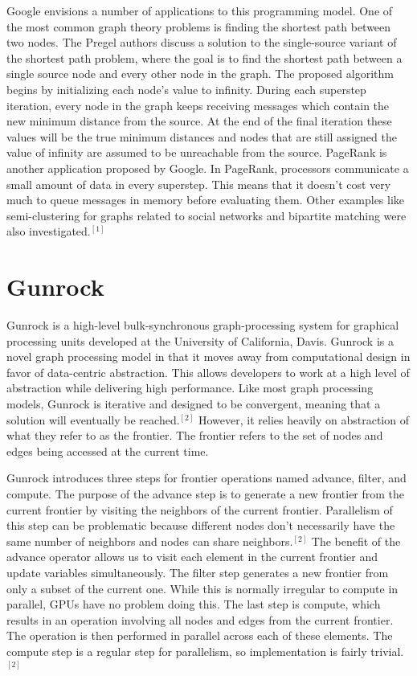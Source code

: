 \documentclass[conference]{IEEEtran}
\begin{document}
Google envisions a number of applications to this programming model.  One of the most common graph theory problems is finding the shortest path between two nodes.  The Pregel authors discuss a solution to the single-source variant of the shortest path problem, where the goal is to find the shortest path between a single source node and every other node in the graph.  The proposed algorithm begins by initializing each node's value to infinity.  During each superstep iteration, every node in the graph keeps receiving messages which contain the new minimum distance from the source.  At the end of the final iteration these values will be the true minimum distances and nodes that are still assigned the value of infinity are assumed to be unreachable from the source.  PageRank is another application proposed by Google.  In PageRank, processors communicate a small amount of data in every superstep.  This means that it doesn't cost very much to queue messages in memory before evaluating them.  Other examples like semi-clustering for graphs related to social networks and bipartite matching were also investigated.$^{[1]}$  

\section{Gunrock}

Gunrock is a high-level bulk-synchronous graph-processing system for graphical processing units developed at the University of California, Davis.  Gunrock is a novel graph processing model in that it moves away from computational design in favor of data-centric abstraction.  This allows developers to work at a high level of abstraction while delivering high performance.  Like most graph processing models, Gunrock is iterative and designed to be convergent, meaning that a solution will eventually be reached.$^{[2]}$  However, it relies heavily on abstraction of what they refer to as the frontier.  The frontier refers to the set of nodes and edges being accessed at the current time.  

Gunrock introduces three steps for frontier operations named advance, filter, and compute.  The purpose of the advance step is to generate a new frontier from the current frontier by visiting the neighbors of the current frontier.  Parallelism of this step can be problematic because different nodes don't necessarily have the same number of neighbors and nodes can share neighbors.$^{[2]}$  The benefit of the advance operator allows us to visit each element in the current frontier and update variables simultaneously.  The filter step generates a new frontier from only a subset of the current one.  While this is normally irregular to compute in parallel, GPUs have no problem doing this.  The last step is compute, which results in an operation involving all nodes and edges from the current frontier.  The operation is then performed in parallel across each of these elements.  The compute step is a regular step for parallelism, so implementation is fairly trivial.$^{[2]}$  
\end{document}
